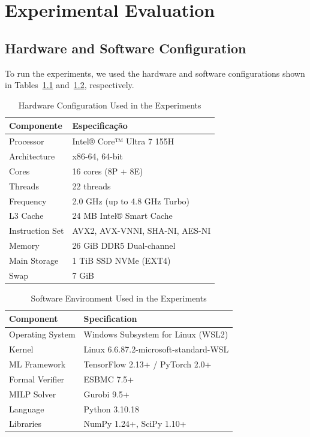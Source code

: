 
\chapter{Experimental Evaluation}\label{chap:experimental_evaluation}


\section{Hardware and Software Configuration}

To run the experiments, we used the hardware and software configurations shown in Tables~\ref{tab:hardware_config} and~\ref{tab:software_config2}, respectively.


\begin{table}[h!]
\centering
\caption{Hardware Configuration Used in the Experiments}
\label{tab:hardware_config}
\begin{tabular}{|l|l|}
\hline
\textbf{Componente} & \textbf{Especificação} \\
\hline
Processor & Intel® Core™ Ultra 7 155H \\
Architecture & x86-64, 64-bit \\
Cores & 16 cores (8P + 8E) \\
Threads & 22 threads \\
Frequency & 2.0 GHz (up to 4.8 GHz Turbo) \\
L3 Cache & 24 MB Intel® Smart Cache \\
Instruction Set & AVX2, AVX-VNNI, SHA-NI, AES-NI \\
\hline
Memory & 26 GiB DDR5 Dual-channel \\
\hline
Main Storage & 1 TiB SSD NVMe (EXT4) \\
Swap & 7 GiB \\
\hline
\end{tabular}
\end{table}

\begin{table}[h!]
\centering
\caption{Software Environment Used in the Experiments}
\label{tab:software_config2}
\begin{tabular}{|l|l|}
\hline
\textbf{Component} & \textbf{Specification} \\
\hline
Operating System & Windows Subsystem for Linux (WSL2) \\
Kernel & Linux 6.6.87.2-microsoft-standard-WSL \\
\hline
ML Framework & TensorFlow 2.13+ / PyTorch 2.0+ \\
Formal Verifier & ESBMC 7.5+ \\
MILP Solver & Gurobi 9.5+ \\
\hline
Language & Python 3.10.18 \\
Libraries & NumPy 1.24+, SciPy 1.10+ \\
\hline
\end{tabular}
\end{table}

